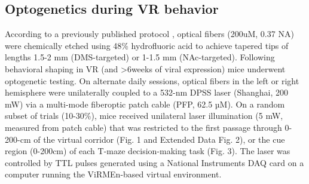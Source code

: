 \subsection{Optogenetics during VR behavior}
\label{sec:ap1:m5}
According to a previously published protocol \cite{hanks_distinct_2015}, optical fibers (200uM, 0.37 NA) were chemically etched using 48\% hydrofluoric acid to achieve tapered tips of lengths 1.5-2 mm (DMS-targeted) or 1-1.5 mm (NAc-targeted). Following behavioral shaping in VR (and >6weeks of viral expression) mice underwent optogenetic testing. On alternate daily sessions, optical fibers in the left or right hemisphere were unilaterally coupled to a 532-nm DPSS laser (Shanghai, 200 mW) via a multi-mode fiberoptic patch cable (PFP, 62.5 µM). On a random subset of trials (10-30\%), mice received unilateral laser illumination (5 mW, measured from patch cable) that was restricted to the first passage through 0-200-cm of the virtual corridor (Fig. 1 and Extended Data Fig. 2), or the cue region (0-200cm) of each T-maze decision-making task (Fig. 3). The laser was controlled by TTL pulses generated using a National Instruments DAQ card on a computer running the ViRMEn-based virtual environment. 


